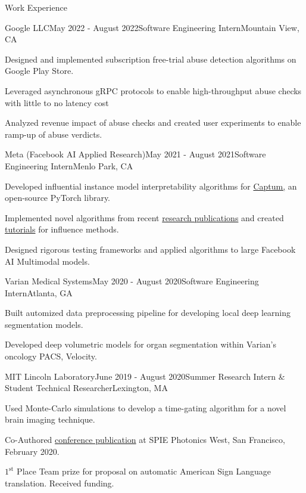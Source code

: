 \documentclass{template} %
\begin{document}
\begin{rSection}{Work Experience}

\begin{rSubsection}{Google LLC}{May 2022 - August 2022}{Software Engineering Intern}{Mountain View, CA}
\item Designed and implemented subscription free-trial abuse detection algorithms on Google Play Store.
\item Leveraged asynchronous gRPC protocols to enable high-throughput abuse checks with little to no latency cost
\item Analyzed revenue impact of abuse checks and created user experiments to enable ramp-up of abuse verdicts.
\end{rSubsection}

\begin{rSubsection}{Meta (Facebook AI Applied Research)}{May 2021 - August 2021}{Software Engineering Intern}{Menlo Park, CA}
\item Developed influential instance model interpretability algorithms for \href{https://captum.ai/}{Captum,} an open-source PyTorch library.
\item Implemented novel algorithms from recent \href{https://arxiv.org/pdf/2002.08484.pdf}{research publications} and created \href{https://captum.ai/tutorials/TracInCP_Tutorial}{tutorials} for influence methods.
\item Designed rigorous testing frameworks and applied algorithms to large Facebook AI Multimodal models.
\end{rSubsection}

\begin{rSubsection}{Varian Medical Systems}{May 2020 - August 2020}{Software Engineering Intern}{Atlanta, GA}
\item Built automized data preprocessing pipeline for developing local deep learning segmentation models.
\item Developed deep volumetric models for organ segmentation within Varian's oncology PACS, Velocity.
\end{rSubsection}

\begin{rSubsection}{MIT Lincoln Laboratory}{June 2019 - August 2020}{Summer Research Intern \& Student Technical Researcher}{Lexington, MA}
\item Used Monte-Carlo simulations to develop a time-gating algorithm for a novel brain imaging technique.
\item Co-Authored \href{https://bit.ly/AGpaper1}{conference publication} at SPIE Photonics West, San Francisco, February 2020.
\item$1^{\text{st}}$ Place Team prize for proposal on automatic American Sign Language translation. Received funding.
\end{rSubsection}

\end{rSection}
\vspace{-2mm}
\end{document}
